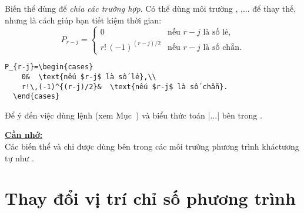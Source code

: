 \medskip
Biến thể  dùng để \emph{chia các trường hợp}.
Có thể dùng môi trường , ,... để thay thế,
nhưng  là cách giúp bạn tiết kiệm thời gian:
\begin{equation}\label{eq:C}
P_{r-j}=
  \begin{cases}
    0&  \text{nếu $r-j$ là số lẻ},\\
    r!\,(-1)^{(r-j)/2}&  \text{nếu $r-j$ là số chẵn}.
  \end{cases}
\end{equation}
\begin{verbatim}
P_{r-j}=\begin{cases}
    0&  \text{nếu $r-j$ là số lẻ},\\
    r!\,(-1)^{(r-j)/2}&  \text{nếu $r-j$ là số chẵn}.
  \end{cases}
\end{verbatim}
Để ý đến việc dùng lệnh  (xem Mục~) và biểu thức
toán |$...$| bên trong .

\medskip
\underline{\textbf{Cần nhớ:}}\\
{Các biến thể  và  chỉ được dùng bên trong
các môi trường phương trình khác\mdash tương tự như .}


\section{Thay đổi vị trí chỉ số phương trình}

